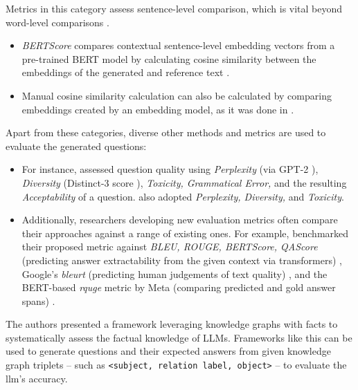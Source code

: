 
 Metrics in this category assess sentence-level comparison, which is vital beyond word-level comparisons \cite{guo_survey_2024}.
\begin{itemize}
   \item \textit{BERTScore} \cite{zhang_bertscore_2020} compares contextual sentence-level embedding vectors from a pre-trained BERT model by calculating cosine similarity between the embeddings of the generated and reference text \cite{guo_survey_2024}.
   \item Manual cosine similarity calculation can also be calculated by comparing embeddings created by an embedding model, as it was done in \cite{li_planning_2024}.
\end{itemize}

 Apart from these categories, diverse other methods and metrics are used to evaluate the generated questions:

\begin{itemize}
   \item For instance, \cite{wang_towards_2022} assessed question quality using \textit{Perplexity} (via GPT-2 \cite{radford_language_2019}), \textit{Diversity} (Distinct-3 score \cite{li_diversity-promoting_2016}), \textit{Toxicity, Grammatical Error,} and the resulting \textit{Acceptability} of a question. \cite{yang_heuristic_2024} also adopted \textit{Perplexity, Diversity,} and \textit{Toxicity}.
   \item Additionally, researchers developing new evaluation metrics often compare their approaches against a range of existing ones. For example, \cite{nguyen_reference-based_2024} benchmarked their proposed metric against \textit{BLEU, ROUGE, BERTScore, QAScore} (predicting answer extractability from the given context via transformers) \cite{ji_qascoreunsupervised_2022}, Google's \textit{\ac{bleurt}} (predicting human judgements of text quality) \cite{sellam_bleurt_2020}, and the BERT-based \textit{\ac{rquge}} metric by Meta (comparing predicted and gold answer spans) \cite{mohammadshahi_rquge_2023}.
\end{itemize}


 The authors \cite{luo_systematic_2023} presented a framework leveraging knowledge graphs with facts to systematically assess the factual knowledge of LLMs. Frameworks like this can be used to generate questions and their expected answers from given knowledge graph triplets -- such as \texttt{<subject, relation label, object>} -- to evaluate the \ac{llm}'s accuracy.

